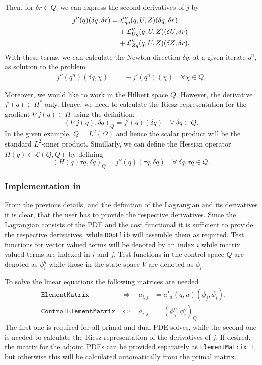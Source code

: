 {Then, for $\delta r\in Q$, we can express the second derivatives of $j$ by
\begin{align*}
j''(q)(\delta q, \delta r) 
&= {\cal L}_{qq}'' (q,U,Z)(\delta q,\delta r) \\
&\;\;\;\;+ {\cal L}_{Uq}'' (q,U,Z)(\delta U,\delta r) \\ 
&\;\;\;\;+ {\cal L}_{Zq}'' (q,U,Z)(\delta Z,\delta r).
\end{align*}
With these terms, we can calculate the Newton direction $\delta q$, at a given 
iterate $q^n$, as solution to the problem
\begin{align*}
j''(q^n )(\delta q,\chi ) =&\, -j'(q^n)(\chi) \quad\forall\chi \in Q.
\end{align*}

Moreover, we would like to work in the Hilbert space $Q$. However, the derivative 
$j'(q) \in H^*$ only. Hence, we need to calculate the Riesz representation 
for the gradient $\nabla j(q) \in H$ using the definition:
\[
 (\nabla j(q),\delta q)_Q = j'(q)(\delta q) \quad \forall\,\delta q\in Q.
\]
In the given example, $Q = L^2(\Omega)$ and hence the scalar product will be the
standard $L^2$-inner product. Simillarly, we can define the Hessian operator 
$H(q) \in \mathcal L(Q,Q)$ by defining
\[
 (H(q)\tau q,\delta q)_Q = j''(q)(\tau q,\delta q) \quad \forall\,\delta q,\tau q\in Q.
\]
}

\subsubsection{Implementation in \dope{}}
From the previous details, and the definition of the Lagrangian and its 
derivatives it is clear, that the user has to provide the respective derivatives. 
Since the Lagrangian consists of the PDE and the cost functional it 
is sufficient to provide the respective derivatives, while \texttt{DOpElib} 
will assemble them as required.
Test functions for vector valued terms will be denoted by an index $i$ while 
matrix valued terms are indexed in $i$ and $j$. Test functions in the control 
space $Q$ are denoted as $\phi^q_i$ while those in the state space $V$ are denoted 
as $\phi_i$.

To solve the linear equations the following matrices are needed{\color{red}
\begin{align*}
&\texttt{ElementMatrix} 
&\Leftrightarrow \quad a_{i,j} &= a'_u(q,u)(\phi_j,\phi_i), \\
&\texttt{ControlElementMatrix}  
&\Leftrightarrow \quad a_{i,j} &= (\phi^q_j, \phi^q_i)_Q.
\end{align*}}
The first one is required for all primal and dual PDE solves, while the second one is needed 
to calculate the Riesz representation of the derivatives of $j$. 
If desired, the matrix for the adjoint PDEs can be provided separately as 
\texttt{ElementMatrix\underline{ }T}, but otherwise this will be 
calculated automatically from the primal matrix.

